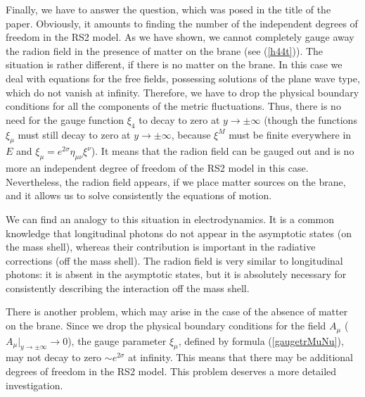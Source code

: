 \documentclass[a4paper,12pt]{article}
\begin{document}
Finally, we have to answer the question, which was posed in the
title of the paper. Obviously, it amounts to finding the number of
the independent degrees of freedom in the RS2 model. As we have
shown, we cannot completely gauge away the radion field in the
presence of  matter on the brane (see (\ref{h44t})). The situation
is rather different, if there is no matter on the brane. In this
case we deal with  equations for the free fields, possessing
solutions  of the plane wave type, which do not vanish at
infinity. Therefore, we have to drop the physical boundary
conditions for all the components of the metric fluctuations.
Thus, there is  no need for the gauge function $\xi_4$ to decay to
zero at $y\to\pm\infty$ (though the functions $\xi_{\mu}$ must
still decay to zero at $y\to\pm\infty$, because  $\xi^M$ must be
finite everywhere in $E$ and
$\xi_{\mu}=e^{2\sigma}\eta_{\mu\nu}\xi^{\nu}$). It means that the
radion field can be gauged out  and is no more  an independent
degree of freedom of the RS2 model in this case. Nevertheless, the
radion field appears, if we place matter  sources on the brane,
and it allows us to solve consistently the equations of motion.

We can find an analogy to this situation in  electrodynamics. It is a
common knowledge that  longitudinal photons do not appear in  the
asymptotic states (on the mass shell), whereas their contribution is
important in the radiative corrections (off the mass shell). The radion
field is very similar to longitudinal photons: it is absent in the
asymptotic states, but it is absolutely necessary for consistently
describing the interaction off the mass shell.

There is another problem, which  may arise in the case of the absence of
matter on the brane. Since we drop the physical boundary conditions for the
field $A_{\mu}$ ($A_{\mu}|_{y\to\pm\infty}\to 0$), the gauge parameter
$\xi_{\mu}$, defined by formula (\ref{gaugetrMuNu}), may not decay to zero
$\sim e^{2\sigma}$ at infinity. This means that there may be additional
degrees of freedom in the RS2 model. This problem deserves  a more detailed
investigation.
\end{document}
